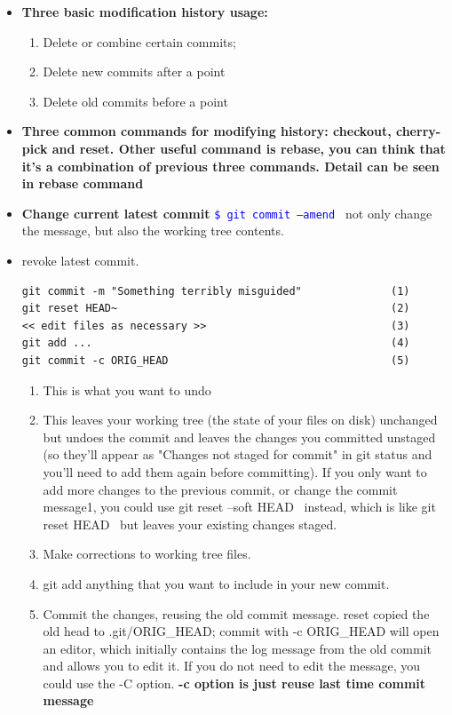 \documentclass[a4paper,11pt,twoside]{book}
\newcommand{\linuxcommand}[1]{\texttt{\textcolor{blue}{\$ #1 \Pisymbol{psy}{191}}}}
\begin{document}
\begin{itemize}
\item \textbf{Three basic modification history usage:}
\begin{enumerate}
\item Delete or combine certain commits;
\item Delete new commits after a point
\item Delete old commits before a point
\end{enumerate}

\item \textbf{Three common commands for modifying history: checkout, cherry-pick and reset. Other useful command is rebase, you can think that it's a combination of previous three commands. Detail can be seen in rebase command}

  \item \textbf{Change current latest commit} \linuxcommand{git commit  --amend} not only change the message, but also the working tree contents. 
    
  \item revoke latest commit.
\begin{verbatim}
git commit -m "Something terribly misguided"              (1)
git reset HEAD~                                           (2)
<< edit files as necessary >>                             (3)
git add ...                                               (4)
git commit -c ORIG_HEAD                                   (5)
\end{verbatim}
\begin{enumerate}
\item This is what you want to undo
\item This leaves your working tree (the state of your files on disk) unchanged but undoes the commit and leaves the changes you committed unstaged (so they'll appear as "Changes not staged for commit" in git status and you'll need to add them again before committing). If you only want to add more changes to the previous commit, or change the commit message1, you could use git reset --soft HEAD~ instead, which is like git reset HEAD~ but leaves your existing changes staged.
\item Make corrections to working tree files.
\item git add anything that you want to include in your new commit.
\item Commit the changes, reusing the old commit message. reset copied the old head to .git/ORIG\_HEAD; commit with -c ORIG\_HEAD will open an editor, which initially contains the log message from the old commit and allows you to edit it. If you do not need to edit the message, you could use the -C option.  \textbf{-c option is just reuse last time commit message}
\end{enumerate}


\end{itemize}
\end{document}
